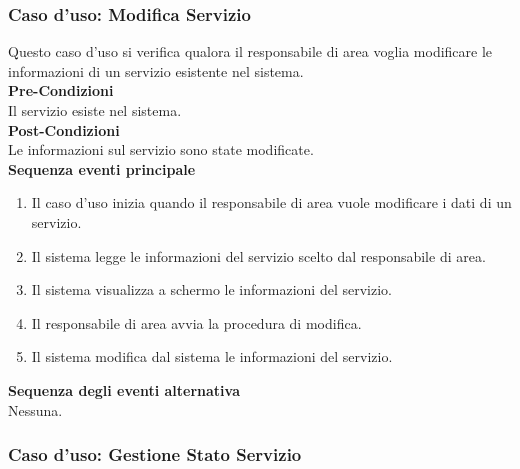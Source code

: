 \documentclass[green, fancy, 11pt]{elegantbook}
\begin{document}
\subsubsection{Caso d'uso: Modifica Servizio}

Questo caso d’uso si verifica qualora il responsabile di area voglia modificare le informazioni di un servizio esistente nel sistema.\\
\textbf{Pre-Condizioni}\\
Il servizio esiste nel sistema.\\
\textbf{Post-Condizioni}\\
Le informazioni sul servizio sono state modificate.\\
\textbf{Sequenza eventi principale}
\begin{enumerate}
	\item Il caso d’uso inizia quando il responsabile di area vuole modificare i dati di un servizio.
	\item Il sistema legge le informazioni del servizio scelto dal responsabile di area.
	\item Il sistema visualizza a schermo le informazioni del servizio.
	\item Il responsabile di area avvia la procedura di modifica.
	\item Il sistema modifica dal sistema le informazioni del servizio.
\end{enumerate}
\textbf{Sequenza degli eventi alternativa}\\
Nessuna.
\newpage

\subsubsection{Caso d'uso: Gestione Stato Servizio}
\end{document}
